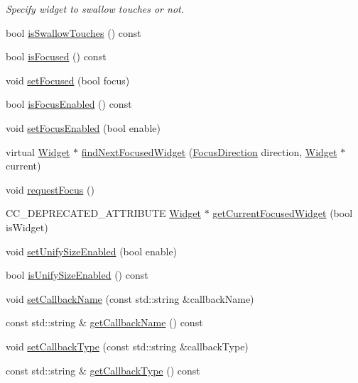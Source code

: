 \begin{DoxyCompactItemize}
\begin{DoxyCompactList}\small\item\em Specify widget to swallow touches or not. \end{DoxyCompactList}\item 
bool \hyperlink{classui_1_1Widget_aa2dab2eca5024f96792a40f5de49f415}{is\+Swallow\+Touches} () const
\item 
bool \hyperlink{classui_1_1Widget_a92a51af74b3c009cf231185554044f50}{is\+Focused} () const
\item 
void \hyperlink{classui_1_1Widget_a8f201a8a4676a135d4e77d2be62cac2b}{set\+Focused} (bool focus)
\item 
bool \hyperlink{classui_1_1Widget_ad8fd665970343c600150eef5a0646126}{is\+Focus\+Enabled} () const
\item 
void \hyperlink{classui_1_1Widget_a017596c74cbd8b7304b27cf2b0eb4756}{set\+Focus\+Enabled} (bool enable)
\item 
virtual \hyperlink{classui_1_1Widget}{Widget} $\ast$ \hyperlink{classui_1_1Widget_a40a7ca0d546f39536dadf60722b947d0}{find\+Next\+Focused\+Widget} (\hyperlink{classui_1_1Widget_a8ae8e8fc793a04a87584205cd1e8a8a5}{Focus\+Direction} direction, \hyperlink{classui_1_1Widget}{Widget} $\ast$current)
\item 
void \hyperlink{classui_1_1Widget_a3f37229935bf05eeb4e08fe70250c52b}{request\+Focus} ()
\item 
C\+C\+\_\+\+D\+E\+P\+R\+E\+C\+A\+T\+E\+D\+\_\+\+A\+T\+T\+R\+I\+B\+U\+TE \hyperlink{classui_1_1Widget}{Widget} $\ast$ \hyperlink{classui_1_1Widget_ae577cff6759bee4c6de4ff9a8ec459ab}{get\+Current\+Focused\+Widget} (bool is\+Widget)
\item 
void \hyperlink{classui_1_1Widget_a95c1265f951f97e9d7088f26ba745ff4}{set\+Unify\+Size\+Enabled} (bool enable)
\item 
bool \hyperlink{classui_1_1Widget_ad4e0c8796f018f4a1a97e9ca860d6f43}{is\+Unify\+Size\+Enabled} () const
\item 
void \hyperlink{classui_1_1Widget_a9055626a00d49c171b008fc8424f3774}{set\+Callback\+Name} (const std\+::string \&callback\+Name)
\item 
const std\+::string \& \hyperlink{classui_1_1Widget_a203e45394e7671583ef71c5a9308762e}{get\+Callback\+Name} () const
\item 
void \hyperlink{classui_1_1Widget_a98c80020539ad23efcad93fd5e42749d}{set\+Callback\+Type} (const std\+::string \&callback\+Type)
\item 
const std\+::string \& \hyperlink{classui_1_1Widget_a594b66f5c19a8395b7b67ab7b8aa70b4}{get\+Callback\+Type} () const

\end{DoxyCompactItemize}
